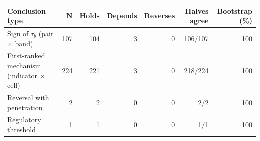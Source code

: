 \begin{tabular}{lrrrrrr}
\toprule
Conclusion type & N & Holds & Depends & Reverses & Halves agree & Bootstrap (\%) \\
\midrule
Sign of $\tau_b$ (pair $\times$ band) & 107 & 104 & 3 & 0 & 106/107 & 100 \\
First-ranked mechanism (indicator $\times$ cell) & 224 & 221 & 3 & 0 & 218/224 & 100 \\
Reversal with penetration & 2 & 2 & 0 & 0 & 2/2 & 100 \\
Regulatory threshold & 1 & 1 & 0 & 0 & 1/1 & 100 \\
\bottomrule
\end{tabular}
